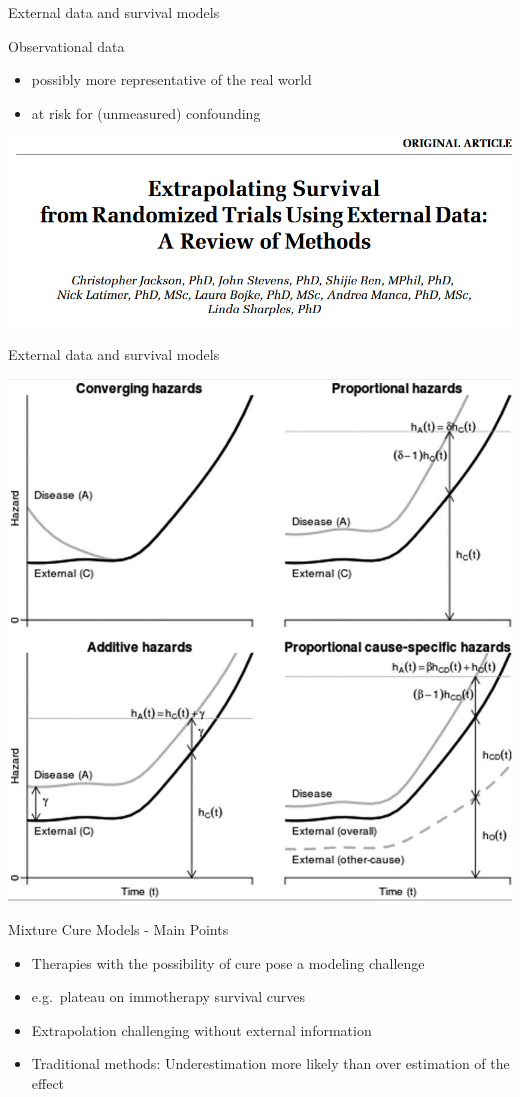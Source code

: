 \documentclass[ignorenonframetext,]{beamer}
\providecommand{\tightlist}{%
  \setlength{\itemsep}{0pt}\setlength{\parskip}{0pt}}
\begin{document}
\begin{frame}{External data and survival models}

Observational data

\begin{itemize}
\tightlist
\item
  possibly more representative of the real world
\item
  at risk for (unmeasured) confounding
\end{itemize}

\includegraphics[width=1\linewidth]{figures/jacksonext}

\end{frame}

\begin{frame}{External data and survival models}

\includegraphics[width=0.7\linewidth]{figures/jacksonfig3}

\end{frame}

\begin{frame}{Mixture Cure Models - Main Points}

\begin{itemize}
\tightlist
\item
  Therapies with the possibility of cure pose a modeling challenge
\item
  e.g.~plateau on immotherapy survival curves
\item
  Extrapolation challenging without external information
\item
  Traditional methods: Underestimation more likely than over estimation
  of the effect
\end{itemize}

\end{frame}
\end{document}
